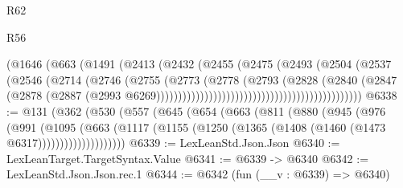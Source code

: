\begin{lexlean}{R62}
\begin{lexlean}{R56}
\begin{coremodule}
{{{{{{{{{{{{{{{{{{{{{{{{{{{{{{{{{{{{{{{{{{{{{{{{{{{{{{{{{{{{{{{{{{{{{{{{{{{{{{{{{{{{{{{{{{{{{{{{{{{{{{{{{{{{{{{{{{{{{{{{{{{{{{{{{{{{{{{{{{{{{{{{{{{{{{{{{{{{{{{{{{{{{{{{{{{{{{{{{{{{{{{{{{{{{{{{{{{{{{{{{{{{{{{{{{{                                                    (@1646
                                                      (@663
                                                        (@1491
                                                          (@2413
                                                            (@2432
                                                              (@2455
                                                                (@2475
                                                                  (@2493
                                                                    (@2504
                                                                      (@2537
                                                                        (@2546
                                                                          (@2714
                                                                            (@2746
                                                                              (@2755
                                                                                (@2773
                                                                                  (@2778
                                                                                    (@2793
                                                                                      (@2828
                                                                                        (@2840
                                                                                          (@2847
                                                                                            (@2878
                                                                                              (@2887
                                                                                                (@2993
                                                                                                  @6269)))))))))))))))))))))))))))))))))))))))))))))))
@6338 := @131
    (@362
      (@530
        (@557
          (@645
            (@654
              (@663
                (@811
                  (@880
                    (@945
                      (@976
                        (@991
                          (@1095
                            (@663
                              (@1117
                                (@1155 (@1250 (@1365 (@1408 (@1460 (@1473 @6317))))))))))))))))))))
@6339 := LexLeanStd.Json.Json
@6340 := LexLeanTarget.TargetSyntax.Value
@6341 := @6339 -> @6340
@6342 := LexLeanStd.Json.Json.rec.{1}
@6344 := @6342 (fun (__v : @6339) => @6340)
}}}}}}}}}}}}}}}}}}}}}}}}}}}}}}}}}}}}}}}}}}}}}}}}}}}}}}}}}}}}}}}}}}}}}}}}}}}}}}}}}}}}}}}}}}}}}}}}}}}}}}}}}}}}}}}}}}}}}}}}}}}}}}}}}}}}}}}}}}}}}}}}}}}}}}}}}}}}}}}}}}}}}}}}}}}}}}}}}}}}}}}}}}}}}}}}}}}}}}}}}}}}}}}}}}}
\end{coremodule}
\end{lexlean}
\end{lexlean}
